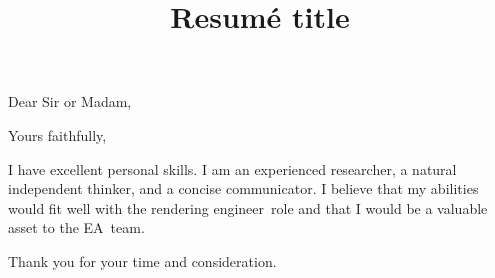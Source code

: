 \documentclass[11pt,a4paper,sans]{moderncv}        %
\title{Resumé title}                               %
\newcommand{\company}{EA}
\newcommand{\role}{rendering engineer}
\begin{document}
\recipient{\company}{HR}
\opening{Dear Sir or Madam,}
\closing{Yours faithfully,}
\makelettertitle



%
%

%
%
%

I have excellent personal skills.
I am an experienced researcher, a natural independent thinker, and a concise communicator.
I believe that my abilities would fit well with the \role~role and that I would be a valuable asset to the \company~team.

Thank you for your time and consideration.
\end{document}
